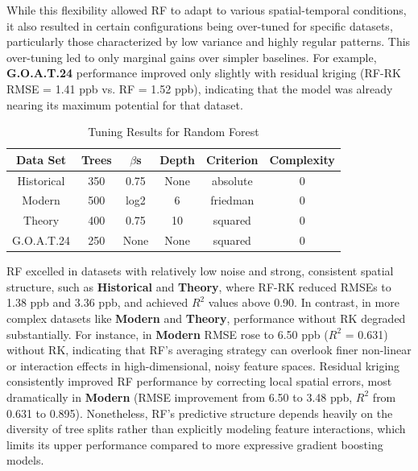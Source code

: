 While this flexibility allowed RF to adapt to various spatial-temporal conditions, it also resulted in certain configurations being over-tuned for specific datasets, particularly those characterized by low variance and highly regular patterns. This over-tuning led to only marginal gains over simpler baselines. For example, \textbf{G.O.A.T.24} performance improved only slightly with residual kriging (RF-RK RMSE = 1.41 ppb vs. RF = 1.52 ppb), indicating that the model was already nearing its maximum potential for that dataset.\begin{table}[h!]
    \centering
        \begin{tabular}{||c|ccccc||}
            \hline 
            \textbf{Data Set} & \textbf{Trees} & \textbf{$\beta$s} & \textbf{Depth} & \textbf{Criterion} & \textbf{Complexity} \\
            \hline \hline 
            Historical & 350 & 0.75 & None & absolute & 0 \\[3pt] 
            Modern	 & 500 & log2 & 6 & friedman & 0 \\[3pt] 
            Theory  & 400 & 0.75 & 10 & squared & 0 \\[3pt] 
            G.O.A.T.24 & 250 & None & None & squared & 0 \\ 
            \hline
        \end{tabular}
    \caption{Tuning Results for Random Forest} 
    \label{tab:rf_model_tuning}
\end{table} RF excelled in datasets with relatively low noise and strong, consistent spatial structure, such as \textbf{Historical} and \textbf{Theory}, where RF-RK reduced RMSEs to 1.38 ppb and 3.36 ppb, and achieved $R^{2}$ values above 0.90. In contrast, in more complex datasets like \textbf{Modern} and \textbf{Theory}, performance without RK degraded substantially. For instance, in \textbf{Modern} RMSE rose to 6.50 ppb ($R^{2}$ = 0.631) without RK, indicating that RF’s averaging strategy can overlook finer non-linear or interaction effects in high-dimensional, noisy feature spaces. Residual kriging consistently improved RF performance by correcting local spatial errors, most dramatically in \textbf{Modern} (RMSE improvement from 6.50 to 3.48 ppb, $R^{2}$ from 0.631 to 0.895). Nonetheless, RF’s predictive structure depends heavily on the diversity of tree splits rather than explicitly modeling feature interactions, which limits its upper performance compared to more expressive gradient boosting models.

